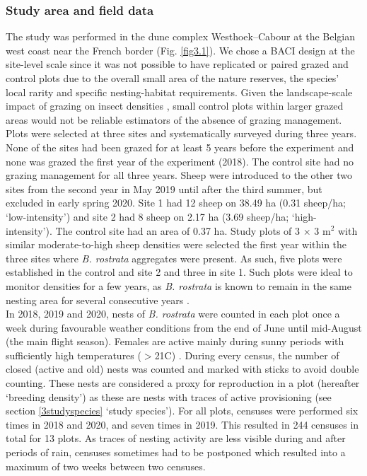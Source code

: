 \documentclass[10pt, twoside]{book} %
\begin{document}
	\subsubsection{Study area and field data}
	The study was performed in the dune complex Westhoek--Cabour at the Belgian west coast near the French border (Fig. \ref{fig3.1}). We chose a BACI design at the site-level scale since it was not possible to have replicated or paired grazed and control plots due to the overall small area of the nature reserves, the species' local rarity and specific nesting-habitat requirements. Given the landscape-scale impact of grazing on insect densities \citep{bonte2008, didham2020}, small control plots within larger grazed areas would not be reliable estimators of the absence of grazing management. Plots were selected at three sites and systematically surveyed during three years. None of the sites had been grazed for at least 5 years before the experiment and none was grazed the first year of the experiment (2018). The control site had no grazing management for all three years. Sheep were introduced to the other two sites from the second year in May 2019 until after the third summer, but excluded in early spring 2020. Site 1 had 12 sheep on 38.49 ha (0.31 sheep/ha; `low-intensity') and site 2 had 8 sheep on 2.17 ha (3.69 sheep/ha; `high-intensity'). The control site had an area of 0.37 ha. Study plots of 3 $\times$ 3 m$^2$ with similar moderate-to-high sheep densities were selected the first year within the three sites where \textit{B. rostrata} aggregates were present. As such, five plots were established in the control and site 2 and three in site 1. Such plots were ideal to monitor densities for a few years, as \textit{B. rostrata} is known to remain in the same nesting area for several consecutive years \citep{nielsen1945, larsson1986, blosch2000, bogusch2021}.\\

	In 2018, 2019 and 2020, nests of \textit{B. rostrata} were counted in each plot once a week during favourable weather conditions from the end of June until mid-August (the main flight season). Females are active mainly during sunny periods with sufficiently high temperatures ($>$21\textdegree C) \citep{nielsen1945, schone1992, evans2007}. During every census, the number of closed (active and old) nests was counted and marked with sticks to avoid double counting. These nests are considered a proxy for reproduction in a plot (hereafter `breeding density') as these are nests with traces of active provisioning (see section \ref{3studyspecies} `study species'). For all plots, censuses were performed six times in 2018 and 2020, and seven times in 2019. This resulted in 244 censuses in total for 13 plots. As traces of nesting activity are less visible during and after periods of rain, censuses sometimes had to be postponed which resulted into a maximum of two weeks between two censuses.\\
\end{document}
